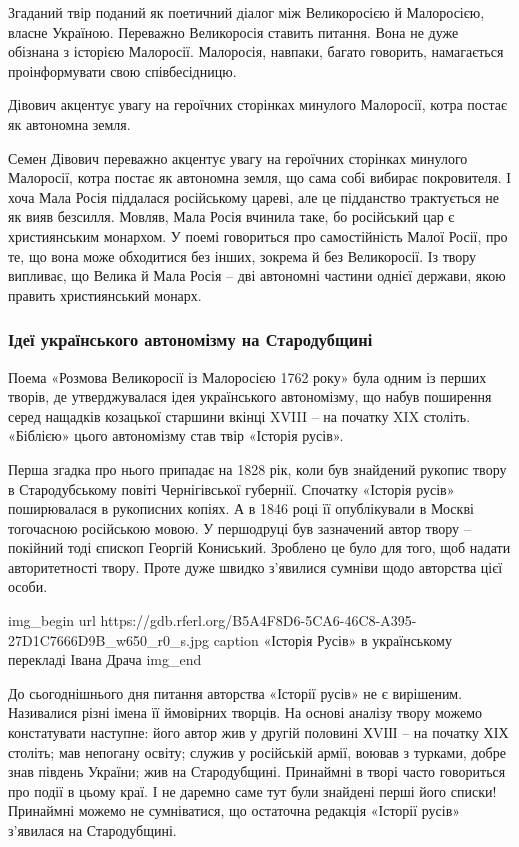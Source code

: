 Згаданий твір поданий як поетичний діалог між Великоросією й Малоросією, власне
Україною. Переважно Великоросія ставить питання. Вона не дуже обізнана з
історією Малоросії. Малоросія, навпаки, багато говорить, намагається
проінформувати свою співбесідницю.

\begin{minipage}
	Дівович акцентує увагу на героїчних сторінках минулого Малоросії, котра постає
	як автономна земля.
\end{minipage}

Семен Дівович переважно акцентує увагу на героїчних сторінках минулого
Малоросії, котра постає як автономна земля, що сама собі вибирає покровителя. І
хоча Мала Росія піддалася російському цареві, але це підданство трактується не
як вияв безсилля. Мовляв, Мала Росія вчинила таке, бо російський цар є
християнським монархом. У поемі говориться про самостійність Малої Росії, про
те, що вона може обходитися без інших, зокрема й без Великоросії. Із твору
випливає, що Велика й Мала Росія – дві автономні частини однієї держави, якою
править християнський монарх.

\subsubsection{Ідеї українського автономізму на Стародубщині}

Поема «Розмова Великоросії із Малоросією 1762 року» була одним із перших
творів, де утверджувалася ідея українського автономізму, що набув поширення
серед нащадків козацької старшини вкінці XVIII – на початку XIX століть.
«Біблією» цього автономізму став твір «Історія русів».

Перша згадка про нього припадає на 1828 рік, коли був знайдений рукопис твору в
Стародубському повіті Чернігівської губернії. Спочатку «Історія русів»
поширювалася в рукописних копіях. А в 1846 році її опублікували в Москві
тогочасною російською мовою. У першодруці був зазначений автор твору – покійний
тоді єпископ Георгій Кониський. Зроблено це було для того, щоб надати
авторитетності твору. Проте дуже швидко з’явилися сумніви щодо авторства цієї
особи.

\ifcmt
img_begin 
	url https://gdb.rferl.org/B5A4F8D6-5CA6-46C8-A395-27D1C7666D9B_w650_r0_s.jpg
	caption «Історія Русів» в українському перекладі Івана Драча
img_end
\fi

До сьогоднішнього дня питання авторства «Історії русів» не є вирішеним.
Називалися різні імена її ймовірних творців. На основі аналізу твору можемо
констатувати наступне: його автор жив у другій половині ХVІІІ – на початку ХІХ
століть; мав непогану освіту; служив у російській армії, воював з турками,
добре знав південь України; жив на Стародубщині. Принаймні в творі часто
говориться про події в цьому краї. І не даремно саме тут були знайдені перші
його списки! Принаймні можемо не сумніватися, що остаточна редакція «Історії
русів» з’явилася на Стародубщині.

